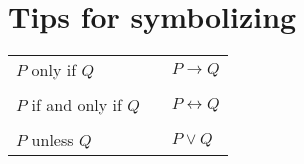 \documentclass[12pt]{article}
\begin{document}
\section*{Tips for symbolizing}

\begin{tabular}{l l l}
  $P$ only if $Q$ & & $P\to Q$ \\ \\
  $P$ if and only if $Q$ & & $P\leftrightarrow Q$ \\ \\
  $P$ unless $Q$ & & $P\vee Q$ \end{tabular}
\end{document}
